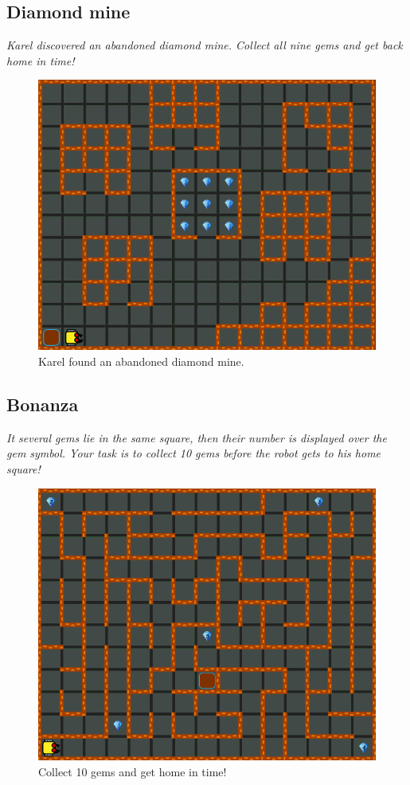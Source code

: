 \subsection{Diamond mine}

{\em Karel discovered an abandoned diamond mine. Collect all nine gems and get back home in time!}

\begin{figure}[!ht]
\begin{center}
\includegraphics[height=0.4\textwidth]{img/a11.png}
\end{center}
\vspace{-4mm}
\caption{Karel found an abandoned diamond mine.}
\label{fig:a11}
\vspace{-10mm}
\end{figure}
\newpage
\noindent

\subsection{Bonanza}

{\em It several gems lie in the same square, then their number is displayed over the gem symbol. Your task is to collect 10 gems before the robot gets to his home square!}

\begin{figure}[!ht]
\begin{center}
\includegraphics[height=0.4\textwidth]{img/a12.png}
\end{center}
\vspace{-4mm}
\caption{Collect 10 gems and get home in time!}
\label{fig:a12}
\vspace{-10mm}
\end{figure}
\noindent

